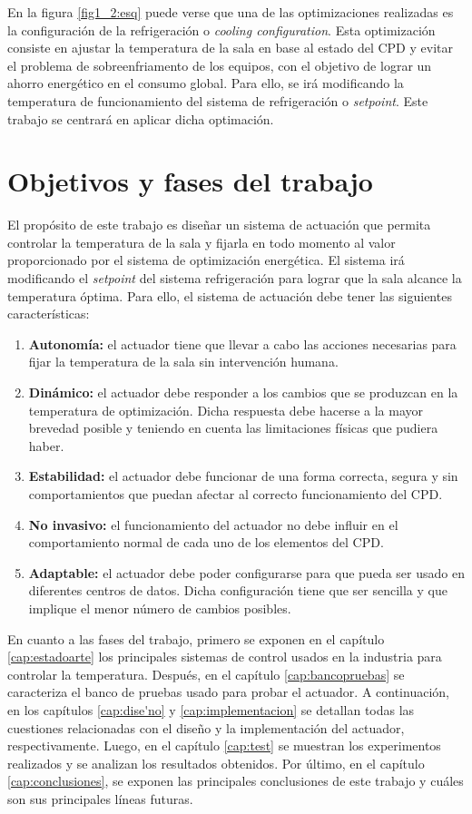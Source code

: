 	En la figura \ref{fig1_2:esq} puede verse que una de las optimizaciones realizadas es la configuración de la refrigeración o \textit{cooling configuration}. Esta optimización consiste en ajustar la temperatura de la sala en base al estado del CPD y evitar el problema de sobreenfriamento de los equipos, con el objetivo de lograr un ahorro energético en el consumo global. Para ello, se irá modificando la temperatura de funcionamiento del sistema de refrigeración o \textit{setpoint}. Este trabajo se centrará en aplicar dicha optimación.

\section{Objetivos y fases del trabajo}\label{sec:obj}

	El propósito de este trabajo es diseñar un sistema de actuación que permita controlar la temperatura de la sala y fijarla en todo momento al valor proporcionado por el sistema de optimización energética. El sistema irá modificando el \textit{setpoint} del sistema refrigeración para lograr que la sala alcance la temperatura óptima. Para ello, el sistema de actuación debe tener las siguientes características:

	\begin{enumerate}
	\item\textbf{Autonomía:} el actuador tiene que llevar a cabo las acciones necesarias para fijar la temperatura de la sala sin intervención humana.
	\item\textbf{Dinámico:} el actuador debe responder a los cambios que se produzcan en la temperatura de optimización. Dicha respuesta debe hacerse a la mayor brevedad posible y teniendo en cuenta las limitaciones físicas que pudiera haber.
	\item\textbf{Estabilidad:} el actuador debe funcionar de una forma correcta, segura y sin comportamientos que puedan afectar al correcto funcionamiento del CPD.
	\item\textbf{No invasivo:} el funcionamiento del actuador no debe influir en el comportamiento normal de cada uno de los elementos del CPD.
	\item\textbf{Adaptable:} el actuador debe poder configurarse para que pueda ser usado en diferentes centros de datos. Dicha configuración tiene que ser sencilla y que implique el menor número de cambios posibles.
	\end{enumerate}

	En cuanto a las fases del trabajo, primero se exponen en el capítulo \ref{cap:estadoarte} los principales sistemas de control usados en la industria para controlar la temperatura. Después, en el capítulo \ref{cap:bancopruebas} se caracteriza el banco de pruebas usado para probar el actuador. A continuación, en los capítulos \ref{cap:dise'no} y \ref{cap:implementacion} se detallan todas las cuestiones relacionadas con el diseño y la implementación del actuador, respectivamente. Luego, en el capítulo \ref{cap:test} se muestran los experimentos realizados y se analizan los resultados obtenidos. Por último, en el capítulo \ref{cap:conclusiones}, se exponen las principales conclusiones de este trabajo y cuáles son sus principales líneas futuras.
